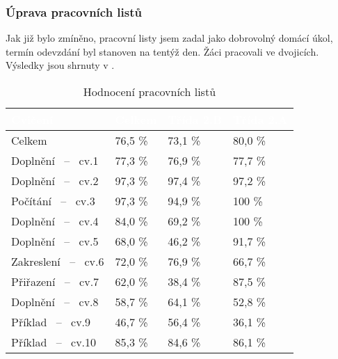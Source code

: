\subsubsection{Úprava pracovních listů}
{Jak již bylo zmíněno, pracovní listy jsem zadal jako dobrovolný domácí úkol, termín odevzdání byl stanoven na tentýž den. Žáci pracovali ve dvojicích. Výsledky jsou shrnuty v .}
\renewcommand{\arraystretch}{1.1}
\begin{table}[H]
    \centering
    \begin{tabular}{|p{3.3cm}|p{2cm}|p{2cm}|p{2cm}|}
        \hline
        \rowcolor{black!60}
        \textcolor{white}{Cvičení} & \textcolor{white}{Celkem} &\textcolor{white}{Třída 2.B} & \textcolor{white}{Třída 2.A} \\
        \hline
        Celkem & \hfill 76,5 \% & \hfill 73,1 \% & \hfill 80,0 \% \\
        \hline
        Doplnění \hfill ~--~ cv.1 & \hfill 77,3 \% & \hfill 76,9 \% & \hfill 77,7 \% \\
        \hline
        Doplnění \hfill ~--~ cv.2 & \hfill 97,3 \% & \hfill 97,4 \% & \hfill 97,2 \% \\
        \hline
        Počítání \hfill ~--~ cv.3 & \hfill 97,3 \% & \hfill  94,9 \% &\hfill  100 \% \\
        \hline
        Doplnění \hfill ~--~ cv.4 & \hfill 84,0 \% & \hfill  69,2 \% &\hfill  100 \% \\
        \hline
        Doplnění \hfill ~--~ cv.5 & \hfill 68,0 \% & \hfill 46,2 \% & \hfill 91,7 \% \\
        \hline
        Zakreslení \hfill ~--~ cv.6 & \hfill 72,0 \% & \hfill 76,9 \% & \hfill 66,7 \% \\
        \hline
        Přiřazení \hfill ~--~ cv.7 & \hfill 62,0 \% & \hfill 38,4 \% & \hfill 87,5 \% \\
        \hline
        Doplnění \hfill ~--~ cv.8 & \hfill 58,7 \% & \hfill 64,1 \% & \hfill 52,8 \% \\
        \hline
        Příklad \hfill ~--~ cv.9 & \hfill 46,7 \% & \hfill 56,4 \% & \hfill 36,1 \% \\
        \hline
        Příklad \hfill ~--~ cv.10 & \hfill 85,3 \% & \hfill 84,6 \% & \hfill 86,1 \% \\
        \hline
    \end{tabular}
    \caption{Hodnocení pracovních listů \jaTab}
    \label{tab:vysledkyPracovnichListu}
\end{table}
